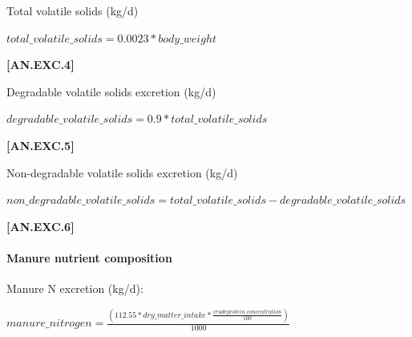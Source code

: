 \documentclass{article}
\begin{document}
\begin{refsection}
\begin{itemize}
Total volatile solids (kg/d)
        \vspace{0.5cm}
    
    \begin{center}
        \(total\_volatile\_solids=0.0023 * body\_weight\)
    \end{center}
        \vspace{0.5cm} 
    
            {\raggedleft \textbf{[AN.EXC.4]}\par}
            \vspace{0.5cm}  

Degradable volatile solids excretion (kg/d)
        \vspace{0.5cm}
    
    \begin{center}
        \(degradable\_volatile\_solids=0.9 * total\_volatile\_solids\)
    \end{center}
        \vspace{0.5cm} 
    
            {\raggedleft \textbf{[AN.EXC.5]}\par}
            \vspace{0.5cm}  

Non-degradable volatile solids excretion (kg/d)
        \vspace{0.5cm}
    
    \begin{center}
        \(non\_degradable\_volatile\_solids = total\_volatile\_solids - degradable\_volatile\_solids\)
    \end{center}
        \vspace{0.5cm} 
    
            {\raggedleft \textbf{[AN.EXC.6]}\par}
            \vspace{0.5cm} 

\paragraph{Manure nutrient composition}
\vspace{-0.25cm}

Manure N excretion (kg/d): 
        \vspace{0.5cm}
    
    \begin{center}
        \(manure\_nitrogen=\frac{(112.55 * dry\_matter\_intake * \frac{crude protein\_concentration}{100})}{1000} \)
    \end{center}
        \vspace{0.5cm} 
    

\end{itemize}
\end{refsection}
\end{document}
